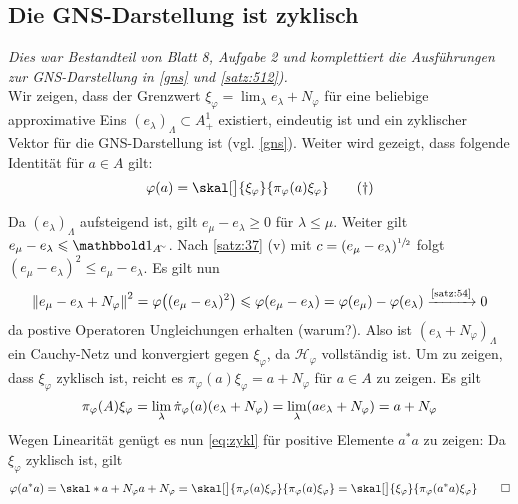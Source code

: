 \subsection{Die GNS-Darstellung ist zyklisch} %
\label{sub:gns_zyklisch}
\emph{Dies war Bestandteil von Blatt 8, Aufgabe 2 und komplettiert die Ausführungen zur GNS-Darstellung in \autoref{gns} und \autoref{satz:512}).} \smallskip \\
Wir zeigen, dass der Grenzwert $\xi_\varphi = \lim_\lambda e_\lambda + N_\varphi$ für eine beliebige approximative Eins $(e_\lambda)_\Lambda \subset A^1_+$ existiert, eindeutig ist und ein zyklischer Vektor für die GNS-Darstellung ist (vgl. \autoref{gns}).
Weiter wird gezeigt, dass folgende Identität für $a \in A$ gilt:
\begin{equation}
	\varphi(a) = \skal[\big]{\xi_\varphi}{\pi_\varphi(a)\xi_\varphi}
	\label{eq:zykl} \tag{\dag}
\end{equation}
\begin{beweis}
	Da $(e_\lambda)_\Lambda$ aufsteigend ist, gilt $e_\mu - e_\lambda \ge 0$ für $\lambda \le \mu$. 
	Weiter gilt $e_\mu - e_\lambda \le \ind_{A^\simm}$.
	Nach \autoref{satz:37} (v) mit $c=(e_\mu -e_\lambda)^{\sfrac{1}{2}}$ folgt $(e_\mu -e_\lambda)^2 \le e_\mu -e_\lambda$.
	Es gilt nun
	\[
		\norm*{e_\mu - e_\lambda + N_\varphi}^2 = \varphi \enbrace[\big]{(e_\mu-e_\lambda)^2} \le \varphi(e_\mu -e_\lambda)= \varphi(e_\mu)- \varphi(e_\lambda)
		\grenzw{\mbox{\scriptsize\ref{satz:54}}} 0
	\]
	da postive Operatoren Ungleichungen erhalten (warum?).
	Also ist $(e_\lambda +N_\varphi)_\Lambda$ ein Cauchy-Netz und konvergiert gegen $\xi_\varphi$, da $\mathcal{H}_\varphi$ vollständig ist.
	Um zu zeigen, dass $\xi_\varphi$ zyklisch ist, reicht es $\pi_\varphi(a) \xi_\varphi = a + N_\varphi$ für $a \in A$ zu zeigen. Es gilt
	\[
		\pi_\varphi(A) \xi_\varphi = \lim_\lambda \dot{\pi}_\varphi(a) \enbrace*{e_\lambda +N_\varphi} = \lim_\lambda \enbrace*{a e_\lambda + N_\varphi} = a+ N_\varphi
	\]
	Wegen Linearität genügt es nun \eqref{eq:zykl} für positive Elemente $a^*a$ zu zeigen: 
	Da $\xi_\varphi$ zyklisch ist, gilt
	\[
		\varphi(a^*a) = \skal*{a+ N_\varphi}{a+N_\varphi} = \skal[\big]{\pi_\varphi(a) \xi_\varphi}{\pi_\varphi(a)\xi_\varphi} = \skal[\big]{\xi_\varphi}{\pi_\varphi(a^*a)\xi_\varphi}\qedhere
	\]
\end{beweis} 

